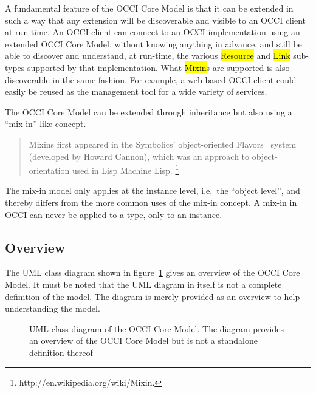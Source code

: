 \documentclass[10pt,a4paper]{article}
\begin{document}
A fundamental feature of the OCCI Core Model is that it can be extended in such a
way that any extension will be discoverable and visible to an OCCI client at
run-time. An OCCI client can connect to an OCCI implementation using an
extended OCCI Core Model, without knowing anything in advance, and still be
able to discover and understand, at run-time, the various \hl{Resource} and \hl{Link} sub-types
supported by that implementation. What \hl{Mixin}s are supported is also discoverable in the 
same fashion. For example, a web-based OCCI client could easily be reused as the 
management tool for a wide variety of services.

The OCCI Core Model can be extended through inheritance but also
using a ``mix-in'' like concept.
\begin{quote}
Mixins first appeared in the Symbolics' 
object-oriented Flavors~\cite{Moon:1986:flavors}
system (developed by Howard Cannon), which was an 
approach to object-orientation used in Lisp Machine Lisp.%
\footnote{http://en.wikipedia.org/wiki/Mixin.}
\end{quote}
%
The mix-in model only applies at the instance
level, i.e.~the ``object level'', and thereby differs from the more common uses
of the mix-in concept. A mix-in in OCCI can never be applied to a type, only to
an instance.

\subsection{Overview}

The UML class diagram shown in figure~\ref{fig:occi_model} gives an overview of
the OCCI Core Model. It must be noted that the UML diagram in itself is not a
complete definition of the model. The diagram is merely provided as an overview
to help understanding the model. 

\begin{figure}[!h]
{\centering {} \par}
\caption{UML class diagram of the OCCI Core Model. The diagram provides an
overview of the OCCI Core Model but is not a standalone definition thereof}
\label{fig:occi_model}
\end{figure}
\end{document}

